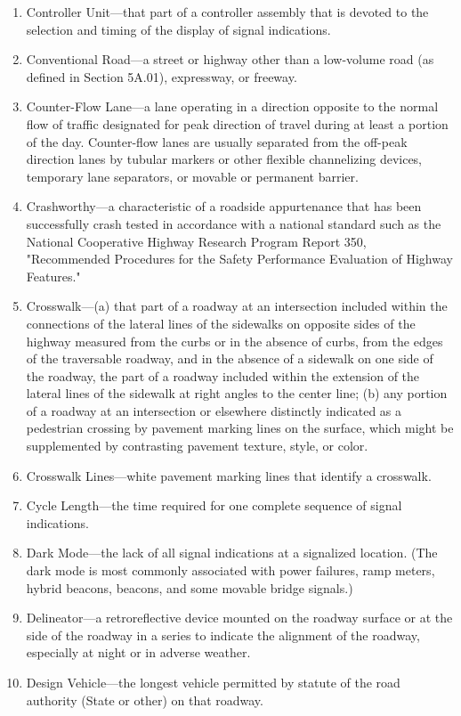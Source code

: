 \documentclass[9pt]{memoir}
\begin{document}
{\begin{enumerate}[label=\arabic*., ref=\arabic*]
\item Controller Unit---that part of a controller assembly that is devoted to the selection and timing of the display of signal indications.
\item Conventional Road---a street or highway other than a low-volume road (as defined in Section 5A.01), expressway, or freeway.
\item Counter-Flow Lane---a lane operating in a direction opposite to the normal flow of traffic designated for peak direction of travel during at least a portion of the day. Counter-flow lanes are usually separated from the off-peak direction lanes by tubular markers or other flexible channelizing devices, temporary lane separators, or movable or permanent barrier.
\item Crashworthy---a characteristic of a roadside appurtenance that has been successfully crash tested in accordance with a national standard such as the National Cooperative Highway Research Program Report 350, "Recommended Procedures for the Safety Performance Evaluation of Highway Features."
\item Crosswalk---(a) that part of a roadway at an intersection included within the connections of the lateral lines of the sidewalks on opposite sides of the highway measured from the curbs or in the absence of curbs, from the edges of the traversable roadway, and in the absence of a sidewalk on one side of the roadway, the part of a roadway included within the extension of the lateral lines of the sidewalk at right angles to the center line; (b) any portion of a roadway at an intersection or elsewhere distinctly indicated as a pedestrian crossing by pavement marking lines on the surface, which might be supplemented by contrasting pavement texture, style, or color.
\item Crosswalk Lines---white pavement marking lines that identify a crosswalk.
\item Cycle Length---the time required for one complete sequence of signal indications.
\item Dark Mode---the lack of all signal indications at a signalized location. (The dark mode is most commonly associated with power failures, ramp meters, hybrid beacons, beacons, and some movable bridge signals.)
\item Delineator---a retroreflective device mounted on the roadway surface or at the side of the roadway in a series to indicate the alignment of the roadway, especially at night or in adverse weather.
\item Design Vehicle---the longest vehicle permitted by statute of the road authority (State or other) on that roadway.

\end{enumerate}}
\end{document}
